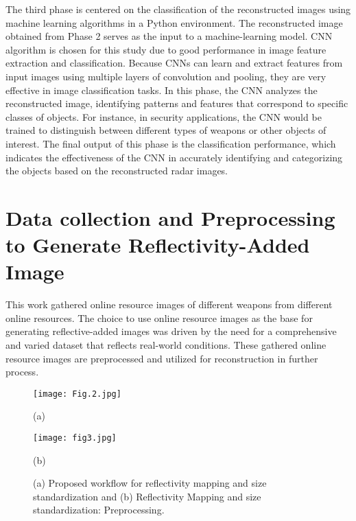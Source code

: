 \documentclass[journal,article,submit,pdftex,moreauthors]{Definitions/mdpi}
\begin{document}
The third phase is centered on the classification of the reconstructed images using machine learning algorithms in a Python environment. The reconstructed image obtained from Phase 2 serves as the input to a machine-learning model. CNN algorithm is chosen for this study due to good performance in image feature extraction and classification. Because CNNs can learn and extract features from input images using multiple layers of convolution and pooling, they are very effective in image classification tasks. In this phase, the CNN analyzes the reconstructed image, identifying patterns and features that correspond to specific classes of objects. For instance, in security applications, the CNN would be trained to distinguish between different types of weapons or other objects of interest. The final output of this phase is the classification performance, which indicates the effectiveness of the CNN in accurately identifying and categorizing the objects based on the reconstructed radar images.

\section{Data collection and Preprocessing to Generate Reflectivity-Added Image}

This work gathered online resource images of different weapons from different online resources. The choice to use online resource images as the base for generating reflective-added images was driven by the need for a comprehensive and varied dataset that reflects real-world conditions. These gathered online resource images are preprocessed and utilized for reconstruction in further process. 


\begin{figure}[h]
    \centering
    \begin{minipage}{0.49\textwidth}
        \centering
        \texttt{[image: Fig.2.jpg]}
        \Centering
        \caption*{(a)}
    \end{minipage}
    \hfill
    \begin{minipage}{0.49\textwidth}
        \centering
        \texttt{[image: fig3.jpg]}
        \Centering
        \caption*{(b)}
    \end{minipage}
    \caption{(a) Proposed workflow for reflectivity mapping and size standardization and (b) Reflectivity Mapping and size standardization: Preprocessing.}
    \label{fig:side_by_side}
\end{figure}
\end{document}
